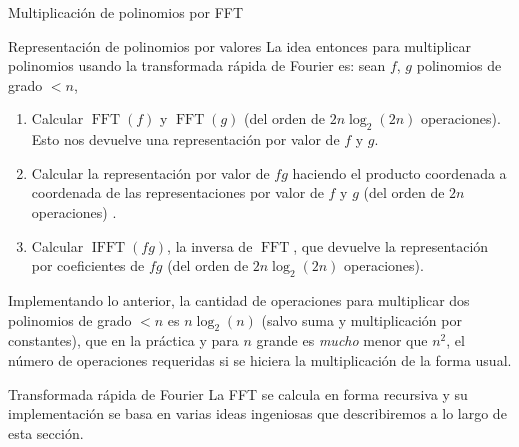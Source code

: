 \begin{chapter}{Multiplicación de polinomios por FFT}
\begin{section}{Representación de polinomios por valores}
        La idea entonces para multiplicar polinomios usando la transformada rápida de Fourier es:  sean $f$, $g$ polinomios de grado $<n$,
        \begin{enumerate}
            \item Calcular $\operatorname{FFT}(f)$ y $\operatorname{FFT}(g)$ (del orden de $2n\operatorname{log}_2(2n)$ operaciones). Esto nos devuelve una representación por valor de $f$ y $g$.
            \item Calcular  la representación por valor de $fg$ haciendo el producto coordenada a coordenada de las representaciones por valor de $f$ y $g$ (del orden de $2n$ operaciones)  .
            \item Calcular $\operatorname{IFFT}(fg)$, la inversa de $\operatorname{FFT}$, que devuelve la representación por coeficientes de $fg$ (del orden de $2n\operatorname{log}_2(2n)$ operaciones).
        \end{enumerate}

        Implementando lo anterior, la cantidad de operaciones para multiplicar dos polinomios de grado $<n$  es $n \log_2(n)$ (salvo suma y multiplicación por constantes), que en la práctica y para $n$ grande es \textit{mucho} menor que $n^2$, el número de operaciones requeridas si se hiciera la multiplicación de la forma usual. 

    \end{section}

        \begin{section}{Transformada rápida de Fourier} La FFT se calcula en forma recursiva y su implementación se basa en varias ideas ingeniosas que describiremos a lo largo de esta sección. 


\end{section}
\end{chapter}
